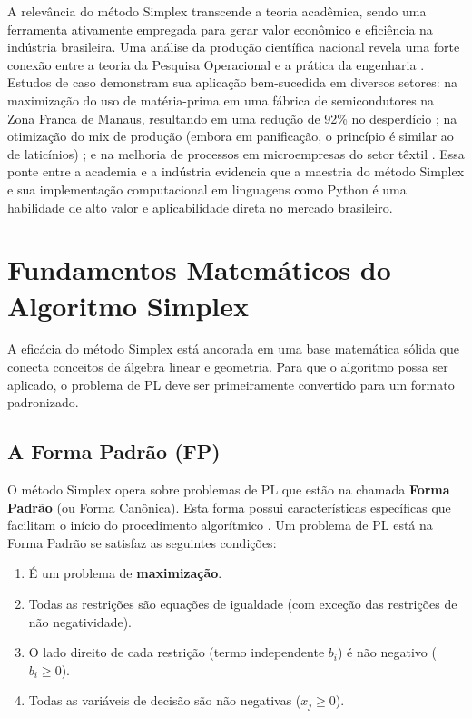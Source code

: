 \documentclass[conference]{IEEEtran}
\begin{document}
A relevância do método Simplex transcende a teoria acadêmica, sendo uma ferramenta ativamente empregada para gerar valor econômico e eficiência na indústria brasileira. Uma análise da produção científica nacional revela uma forte conexão entre a teoria da Pesquisa Operacional e a prática da engenharia \cite{silva2018}. Estudos de caso demonstram sua aplicação bem-sucedida em diversos setores: na maximização do uso de matéria-prima em uma fábrica de semicondutores na Zona Franca de Manaus, resultando em uma redução de 92\% no desperdício \cite{pereira}; na otimização do mix de produção (embora em panificação, o princípio é similar ao de laticínios) \cite{milhomem}; e na melhoria de processos em microempresas do setor têxtil \cite{silva2018}. Essa ponte entre a academia e a indústria evidencia que a maestria do método Simplex e sua implementação computacional em linguagens como Python é uma habilidade de alto valor e aplicabilidade direta no mercado brasileiro.

\section{Fundamentos Matemáticos do Algoritmo Simplex}
A eficácia do método Simplex está ancorada em uma base matemática sólida que conecta conceitos de álgebra linear e geometria. Para que o algoritmo possa ser aplicado, o problema de PL deve ser primeiramente convertido para um formato padronizado.

\subsection{A Forma Padrão (FP)}
O método Simplex opera sobre problemas de PL que estão na chamada \textbf{Forma Padrão} (ou Forma Canônica). Esta forma possui características específicas que facilitam o início do procedimento algorítmico \cite{macambira}. Um problema de PL está na Forma Padrão se satisfaz as seguintes condições:
\begin{enumerate}
    \item É um problema de \textbf{maximização}.
    \item Todas as restrições são equações de igualdade (com exceção das restrições de não negatividade).
    \item O lado direito de cada restrição (termo independente $b_i$) é não negativo ($b_i \ge 0$).
    \item Todas as variáveis de decisão são não negativas ($x_j \ge 0$).
\end{enumerate}
\end{document}
